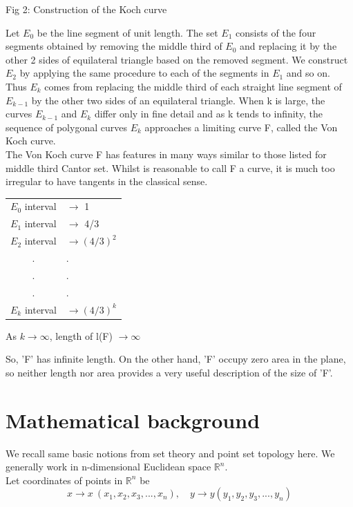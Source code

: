 \documentclass[14pt]{extarticle}
\begin{document}
\begin{enumerate}
\begin{center}
Fig 2: Construction of the Koch curve

\end{center}
Let $E_0$ be the line segment of unit length. The set $E_1$ consists of the four segments obtained by removing the middle third of $E_0$ and replacing it by the other 2 sides of equilateral triangle based on the removed segment. We construct $E_2$ by applying the same procedure to each of the segments in $E_1$ and so on. Thus $E_k$ comes from replacing the middle third of each straight line segment of $E_{k-1}$ by the other two sides of an equilateral triangle. When k is large, the curves $E_{k-1}$ and $E_k$ differ only in fine detail and as k tends to infinity, the sequence of polygonal curves $E_k$ approaches a limiting curve F, called the Von Koch curve. \\



The Von Koch curve F has features in many ways similar to those listed for middle third Cantor set. Whilst is reasonable to call F a curve, it is much too irregular to have tangents in the classical sense.\\

\begin{center}
\begin{tabular}{cl}
$E_0$ interval & $\rightarrow$ 1  \\
$E_1$ interval & $\rightarrow$ 4/3   \\
$E_2$ interval & $\rightarrow (4/3)^2$    \\
.&.\\
.&.\\
.&.\\
$E_k $ interval & $ \rightarrow (4/3)^k$\\
\end{tabular}

As $k\rightarrow\infty$, length of l(F) $\rightarrow\infty$
\end{center}

So, 'F' has infinite length. On the other hand, 'F' occupy zero area in the plane, so neither length nor area provides a very useful description of the size of 'F'.

\pagebreak
\section{Mathematical background}
We recall same basic notions from set theory and point set topology here. We generally work in n-dimensional Euclidean space $\mathbb{R}^n$.\\
Let coordinates of points in $\mathbb{R}^n$ be\\
$$x \rightarrow x\ (x_1,x_2,x_3,...,x_n),\quad y \rightarrow y(y_1,y_2,y_3,...,y_n)$$\\


\end{enumerate}
\end{document}
